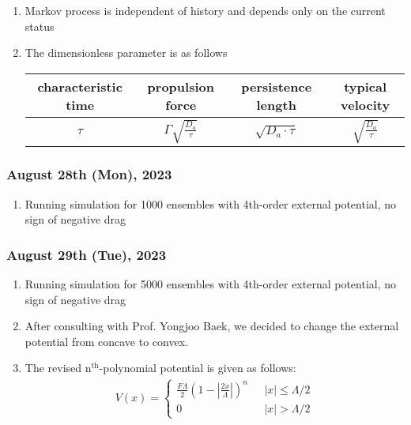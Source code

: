 \documentclass[12pt]{scrartcl}
\numberwithin{equation}{subsubsection}
\begin{document}
\begin{enumerate}
\item Markov process is independent of history and depends only on the current status

\item The dimensionless parameter is as follows
\begin{center}
    \begin{tabular}{||c|c|c|c||} 
        \hline
        characteristic time & propulsion force & persistence length & typical velocity \\
        \hline\hline
        $\tau$ & $\Gamma\sqrt{\frac{D_a}{\tau}}$ & $\sqrt{D_a\cdot\tau}$ & $\sqrt{\frac{D_a}{\tau}}$ \\
        \hline
    \end{tabular}
\end{center}

\end{enumerate}

\subsubsection{August 28th (Mon), 2023}

\begin{enumerate}
    \item Running simulation for 1000 ensembles with 4th-order external potential, no sign of negative drag
\end{enumerate}

\subsubsection{August 29th (Tue), 2023}

\begin{enumerate}
    \item Running simulation for 5000 ensembles with 4th-order external potential, no sign of negative drag
    
    \item After consulting with Prof. Yongjoo Baek, we decided to change the external potential from concave to convex.
    
    \item The revised n$^{\text{th}}$-polynomial potential is given as follows:
    \begin{align}
        V(x)=
        \begin{cases}
            \frac{F\Lambda}{2}\left(1-\left|\frac{2x}{\Lambda}\right|\right)^n&\text{ $|x|\leq\Lambda/2$}\\
            0&\text{ $|x|>\Lambda/2$}
        \end{cases}
    \end{align}
\end{enumerate}



\end{document}
